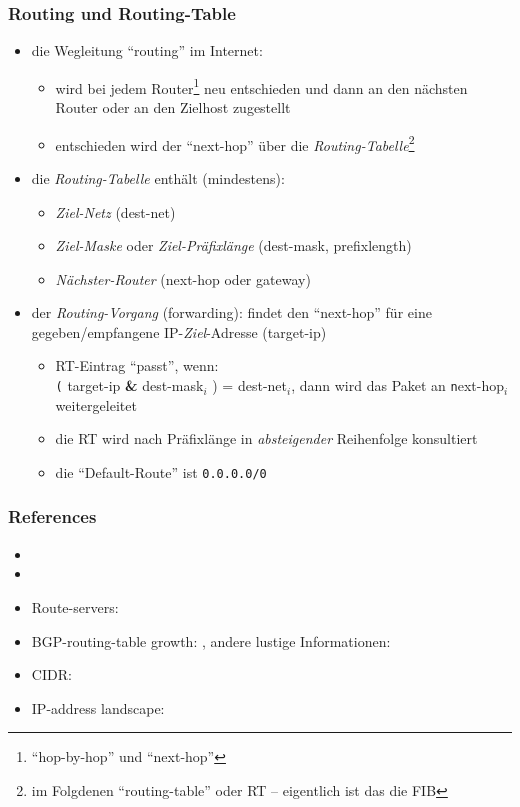 \documentclass{beamer}
\begin{document}
\begin{frame}
\frametitle{Routing und Routing-Table}
\begin{itemize}
	\item{die Wegleitung ``routing'' im Internet:}
	\begin{itemize}
	\item{{\tiny wird bei jedem Router\footnote{``hop-by-hop'' und ``next-hop''} neu entschieden und dann an den n\"achsten Router oder an den Zielhost zugestellt}}
	\item{{\tiny entschieden wird der ``next-hop'' \"uber die {\em Routing-Tabelle}\footnote{im Folgdenen ``routing-table'' oder RT -- eigentlich ist das die FIB}}}
\end{itemize}
\item{die {\em Routing-Tabelle} enth\"alt (mindestens):}
\begin{itemize}
	\item{{\tiny {\em Ziel-Netz} (dest-net)}}
	\item{{\tiny {\em Ziel-Maske} oder {\em Ziel-Pr\"afixl\"ange} (dest-mask, prefixlength)}}
	\item{{\tiny {\em N\"achster-Router} (next-hop oder gateway)}}
\end{itemize}
\item{der {\em Routing-Vorgang} (forwarding): findet den ``next-hop'' f\"ur eine gegeben/empfangene IP-{\em Ziel}-Adresse (target-ip)}
\begin{itemize}
	\item{RT-Eintrag ``passt'', wenn: \\{\texttt ( target-ip {\textbf \&} dest-mask$_{i}$ ) = dest-net$_{i}$}, dann wird das Paket an {\texttt next-hop$_{i}$} weitergeleitet}
	\item{die RT wird nach Pr\"afixl\"ange in {\em absteigender} Reihenfolge konsultiert}
	\item{die ``Default-Route'' ist \texttt{0.0.0.0/0}}
\end{itemize}
\end{itemize}
\end{frame}



\begin{frame}
\frametitle{References}
\begin{itemize}
	\item{}
	\item{}
	\item{Route-servers: }
	\item{BGP-routing-table growth: , andere lustige Informationen: }
	\item{CIDR: }
	\item{IP-address landscape: }
\end{itemize}
\end{frame}
\end{document}
